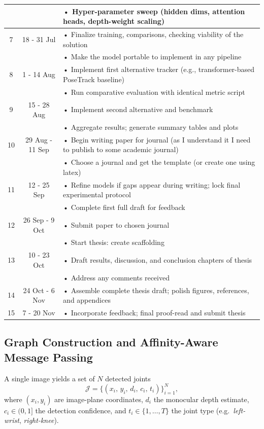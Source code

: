 \begin{longtable}{@{} c c p{10.5cm} @{}}
   &            & • Hyper-parameter sweep (hidden dims, attention heads, depth-weight scaling)\\
\midrule
7  & 18 - 31 Jul & • Finalize training, comparisons, checking viability of the solution\\
   &             & • Make the model portable to implement in any pipeline\\
\midrule
8  & 1 - 14 Aug & • Implement first alternative tracker (e.g., transformer-based PoseTrack baseline)\\
   &            & • Run comparative evaluation with identical metric script\\
\midrule
9  & 15 - 28 Aug & • Implement second alternative and benchmark\\
   &             & • Aggregate results; generate summary tables and plots\\
\midrule
10 & 29 Aug - 11 Sep & • Begin writing paper for journal (as I understand it I need to publish to some academic journal)\\
   &            & • Choose a journal and get the template (or create one using latex)\\
\midrule
11 & 12 - 25 Sep & • Refine models if gaps appear during writing; lock final experimental protocol\\
   &             & • Complete first full draft for feedback\\
\midrule
12 & 26 Sep - 9 Oct & • Submit paper to chosen journal\\
   &                & • Start thesis: create scaffolding\\
\midrule
13 & 10 - 23 Oct & • Draft results, discussion, and conclusion chapters of thesis\\
   &             & • Address any comments received\\
\midrule
14 & 24 Oct - 6 Nov & • Assemble complete thesis draft; polish figures, references, and appendices\\
\midrule
15 & 7 - 20 Nov & • Incorporate feedback; final proof-read and submit thesis\\
\end{longtable}

\subsection{Graph Construction and Affinity-Aware Message Passing}
\label{sec:graph_construction}

A single image yields a set of \(N\) detected joints
\begin{equation}
\mathcal{J}
  =\bigl\{(x_i,\,y_i,\,d_i,\,c_i,\,t_i)\bigr\}_{i=1}^{N},
\label{eq:joint_set}
\end{equation}
where \((x_i,y_i)\) are image-plane coordinates,  
\(d_i\) the monocular depth estimate,  
\(c_i\in(0,1]\) the detection confidence,  
and \(t_i\in\{1,\dots,T\}\) the joint type
(e.g.\ \emph{left-wrist}, \emph{right-knee}).

